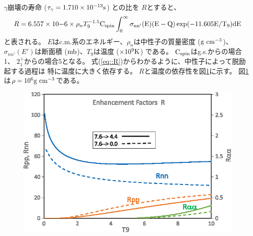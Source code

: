 $\gamma$崩壊の寿命 ($\tau_{\gamma} = 1.710\times10^{-13} \rm{s}$) との比を
$R$とすると、
\begin{equation}
  R = 6.557\times10{-6}\times\rho_{n}T_{9}^{-1.5}\rm{C}_{\rm{spin}}
  \int^{\infty}_{0}\sigma_{nn'}(E)(E-Q)\exp(-11.605E/T_{9})dE
  \label{eq::R}
\end{equation}
と表される。
$E$はc.m.系のエネルギー、$\rho_{n}$は中性子の質量密度 ($\rm{g}~\rm{cm}^{-3}$)、
$\sigma_{nn'}(E')$は断面積 ($\rm{mb}$)、$T_{9}$は温度 ($\times10^{9} \rm{K}$) である。
$\rm{C}_{\rm{spin}}$はg.s.からの場合1、
$2_{1}^{+}$からの場合5となる。
式(\ref{eq::R})からわかるように、中性子によって脱励起する過程は
特に温度に大きく依存する。
$R$と温度の依存性を図\ref{fig::R}に示す。
図\ref{fig::R}は$\rho = 10^{6}\rm{g}~\rm{cm}^{-3}$である。
\begin{figure}
  \centering
  \includegraphics[clip, width=0.6\columnwidth]{eps/R_T.eps}
  \caption{}
  \label{fig::R}
\end{figure}

